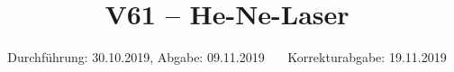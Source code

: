 \title{V61 – He-Ne-Laser}
\date{Durchführung: 30.10.2019, Abgabe: 09.11.2019 \,\,\,\,\,\,\, Korrekturabgabe: 19.11.2019}

